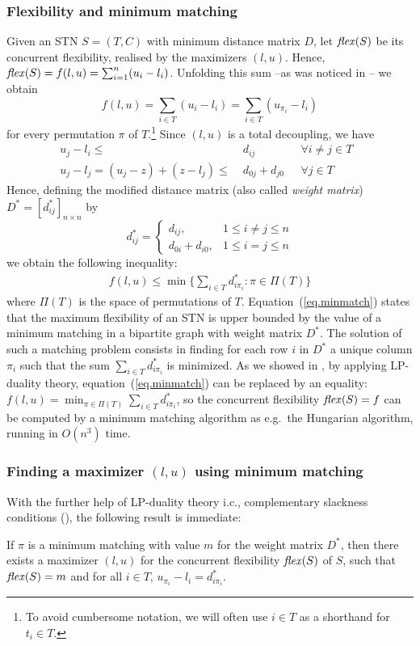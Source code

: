 \subsubsection{Flexibility and minimum matching }
Given an STN $S = (T, C)$ with minimum distance matrix $D$, let $\mathit{flex}(S)$ be its concurrent flexibility, realised by the maximizers $(l, u)$. 
Hence, $\mathit{flex}(S) = f(l,u) = \sum^n_{i=1} (u_i - l_i)$. Unfolding this sum --as was noticed in \cite{mountakis:2015}-- we obtain 
\begin{equation} f(l, u) = \sum_{i\in T} (u_i - l_i) = \sum_{i\in T} (u_{\pi_i} - l_i) \end{equation}
for every permutation $\pi$ of $T$.\footnote{To avoid cumbersome notation, we will often use $i \in T$ as a shorthand for $t_i \in T$.}
Since $(l,u)$ is a total decoupling, we have 
\begin{align}
 u_j - l_i \leq& \; d_{ij}  &\mbox{ $\forall i \neq j \in T$ } \\ 
u_j - l_j = ( u_j - z) + (z -l_j) \leq& \; d_{0j}+d_{j0} &\mbox{ $\forall j \in T$}
\end{align}
Hence, defining the modified distance  matrix (also called \emph{weight matrix}) $D^* = [d^*_{ij}]_{n \times n}$ by 
\[
d^*_{ij} =
\begin{cases}
d_{ij}, & 1 \leq i \neq j \leq n \\
d_{0i}+d_{i0}, & 1 \leq i=j \leq n
\end{cases}
\]
we obtain the following inequality:
\begin{align} 
	f(l, u) \leq \min \{\sum_{i\in T} d^*_{i\pi_i}: \pi \in \Pi(T)\}  \label{eq.minmatch}	
\end{align}
where $\Pi(T)$ is the space of permutations of $T$.
Equation~(\ref{eq.minmatch}) states that the maximum flexibility of an STN is upper bounded by the value of a minimum matching in a bipartite graph with weight matrix $D^*$. The solution of such a matching problem consists in finding for each row $i$ in $D^*$ a unique column $\pi_i$ such that the
sum $\sum_{i\in T} d^*_{i\pi_i}$ is minimized.  As we showed in \cite{mountakis:2015}, by applying LP-duality theory, equation~(\ref{eq.minmatch}) can be replaced by an equality: $f(l, u) = \min_{\pi \in \Pi(T)} \sum_{i \in T} d^*_{i\pi_i}$, so the concurrent flexibility $\mathit{flex}(S) = f$ can be computed by a minimum matching algorithm as e.g.\ the Hungarian algorithm, running in $O(n^3)$ time.

\subsubsection{Finding a maximizer $(l, u)$ using minimum matching } With the further help of LP-duality theory i.c., complementary slackness conditions (\cite{papadimitriou:1982}), the following result is immediate:
\begin{observation} \label{prop.CS}
If $\pi$ is a minimum matching with value $m$ for the weight matrix $D^*$, then there exists a maximizer $(l, u)$ for the concurrent flexibility $\mathit{flex}(S)$ of $S$, such that $\mathit{flex}(S) =m $ and
for all $i \in T$, $u_{\pi_i} - l_i = d^*_{i\pi_i}$.
\end{observation}  


